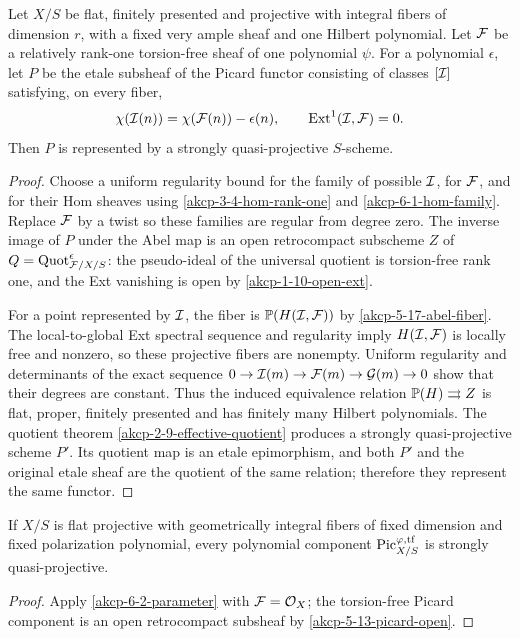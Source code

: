 \begin{proposition}
\label{akcp-6-2-parameter}
Let $X/S$ be flat, finitely presented and projective with integral fibers of
dimension $r$, with a fixed very ample sheaf and one Hilbert polynomial.  Let
$\mathcal F$ be a relatively rank-one torsion-free sheaf of one polynomial $\psi$.
For a polynomial $\epsilon$, let $P$ be the etale subsheaf of the Picard
functor consisting of classes $[\mathcal I]$ satisfying, on every fiber,
\[
\chi(\mathcal I(n))=\chi(\mathcal F(n))-\epsilon(n),\qquad
\operatorname{Ext}^1(\mathcal I,\mathcal F)=0.
\]
Then $P$ is represented by a strongly quasi-projective $S$-scheme.
\end{proposition}
\begin{proof}
Choose a uniform regularity bound for the family of possible $\mathcal I$, for $\mathcal F$,
and for their Hom sheaves using \cref{akcp-3-4-hom-rank-one} and
\cref{akcp-6-1-hom-family}.
Replace $\mathcal F$ by a twist so these families are regular from degree zero.  The
inverse image of $P$ under the Abel map is an open retrocompact subscheme
$Z$ of $Q=\operatorname{Quot}^\epsilon_{\mathcal F/X/S}$: the pseudo-ideal of the universal quotient
is torsion-free rank one, and the Ext vanishing is open by
\cref{akcp-1-10-open-ext}.

For a point represented by $\mathcal I$, the fiber is
$\mathbb P(H(\mathcal I,\mathcal F))$ by \cref{akcp-5-17-abel-fiber}.  The local-to-global Ext
spectral sequence and regularity imply $H(\mathcal I,\mathcal F)$ is locally free and
nonzero, so these projective fibers are nonempty.  Uniform regularity and
determinants of the exact sequence
$0\to\mathcal I(m)\to\mathcal F(m)\to\mathcal G(m)\to0$ show that their degrees are constant.
Thus the induced equivalence relation $\mathbb P(H)\rightrightarrows Z$ is flat,
proper, finitely presented and has finitely many Hilbert polynomials.  The
quotient theorem \cref{akcp-2-9-effective-quotient} produces a strongly
quasi-projective scheme $P'$.  Its quotient map is an etale epimorphism, and
both $P'$ and the original etale sheaf are the quotient of the same relation;
therefore they represent the same functor.
\end{proof}

\begin{theorem}
\label{akcp-6-3-picard-integral}
If $X/S$ is flat projective with geometrically integral fibers of fixed
dimension and fixed polarization polynomial, every polynomial component
$\operatorname{Pic}^{\varphi,\mathrm{tf}}_{X/S}$ is strongly quasi-projective.
\end{theorem}
\begin{proof}
Apply \cref{akcp-6-2-parameter} with $\mathcal F=\mathcal O_X$; the torsion-free Picard
component is an open retrocompact subsheaf by \cref{akcp-5-13-picard-open}.
\end{proof}

